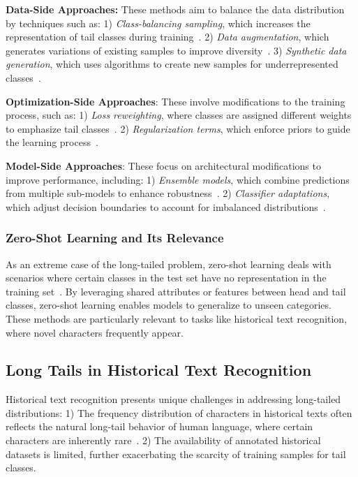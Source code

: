 \noindent\textbf{Data-Side Approaches: } These methods aim to balance the data distribution by techniques such as:
1) \textit{Class-balancing sampling}, which increases the representation of tail classes during training~\cite{upsam}.
2) \textit{Data augmentation}, which generates variations of existing samples to improve diversity~\cite{cutmix}.
3) \textit{Synthetic data generation}, which uses algorithms to create new samples for underrepresented classes~\cite{smote,hzsl}.
   

\noindent\textbf{Optimization-Side Approaches}: These involve modifications to the training process, such as:
1) \textit{Loss reweighting}, where classes are assigned different weights to emphasize tail classes~\cite{focal,otem}.
2) \textit{Regularization terms}, which enforce priors to guide the learning process~\cite{fudanvi,sanicdar23,logvar}.

\noindent\textbf{Model-Side Approaches}: These focus on architectural modifications to improve performance, including:
1) \textit{Ensemble models}, which combine predictions from multiple sub-models to enhance robustness~\cite{fle,flmoe}.
2) \textit{Classifier adaptations}, which adjust decision boundaries to account for imbalanced distributions~\cite{normrob}.

\subsubsection{Zero-Shot Learning and Its Relevance}

As an extreme case of the long-tailed problem, zero-shot learning deals with scenarios where certain classes in the test set have no representation in the training set~\cite{gzsl-survey,olt}. By leveraging shared attributes or features between head and tail classes, zero-shot learning enables models to generalize to unseen categories. These methods are particularly relevant to tasks like historical text recognition, where novel characters frequently appear.

\subsection{Long Tails in Historical Text Recognition}

Historical text recognition presents unique challenges in addressing long-tailed distributions:
1) The frequency distribution of characters in historical texts often reflects the natural long-tail behavior of human language, where certain characters are inherently rare~\cite{yang2022survey}.
2) The availability of annotated historical datasets is limited, further exacerbating the scarcity of training samples for tail classes.

